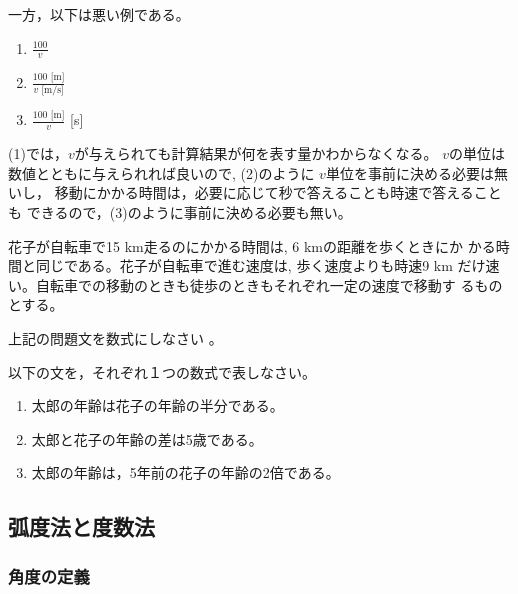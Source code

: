\documentclass[twocolumn,11pt]{jarticle}
\begin{document}
一方，以下は悪い例である。
\begin{enumerate}
\item $\displaystyle\frac{100}{v}$
\item $\displaystyle\frac{100\mbox{~[m]}}{v\mbox{~[m$/$s]}}$
\item $\displaystyle\frac{100\mbox{~[m]}}{v}$ [s]
\end{enumerate}
(1)では，$v$が与えられても計算結果が何を表す量かわからなくなる。
$v$の単位は数値とともに与えられれば良いので, (2)のように
$v$単位を事前に決める必要は無いし，
移動にかかる時間は，必要に応じて秒で答えることも時速で答えることも
できるので，(3)のように事前に決める必要も無い。

\noindent
[問]  花子が自転車で15 km走るのにかかる時間は, 6 kmの距離を歩くときにか
かる時間と同じである。花子が自転車で進む速度は, 歩く速度よりも時速9 km
だけ速い。自転車での移動のときも徒歩のときもそれぞれ一定の速度で移動す
るものとする。

上記の問題文を数式にしなさい
。

\exercise
以下の文を，それぞれ１つの数式で表しなさい。
\begin{enumerate}
	\item 太郎の年齢は花子の年齢の半分である。
	\item 太郎と花子の年齢の差は5歳である。
	\item 太郎の年齢は，5年前の花子の年齢の2倍である。
\end{enumerate}


\subsection{弧度法と度数法}
\subsubsection{角度の定義}
\end{document}
